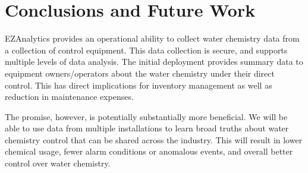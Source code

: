\section{Conclusions and Future Work}
\label{sec:conclude}

EZAnalytics provides an operational ability to collect water chemistry
data from a collection of control equipment.  This data collection
is secure, and supports multiple levels of data analysis.
The initial deployment provides summary data to equipment owners/operators
about the water chemistry under their direct control.
This has direct implications for inventory management as well as
reduction in maintenance expenses.

The promise, however, is potentially substantially more beneficial.  We will
be able to use data from multiple installations to learn broad truths
about water chemistry control that can be shared across the industry.
This will result in lower chemical usage, fewer alarm
conditions or anomalous events,
and overall better control over water chemistry.

